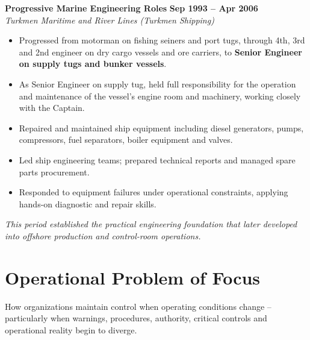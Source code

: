 \documentclass[11pt,a4paper]{article}
\begin{document}
\textbf{\color{avcsdark}Progressive Marine Engineering Roles} \hfill \textbf{\color{avcsgray}Sep 1993 -- Apr 2006} \\
\textit{Turkmen Maritime and River Lines (Turkmen Shipping)} \\
\vspace{2pt}
\begin{itemize}[leftmargin=*, nosep, itemsep=2pt]
    \item Progressed from motorman on fishing seiners and port tugs, through 4th, 3rd and 2nd engineer on dry cargo vessels and ore carriers, to \textbf{Senior Engineer on supply tugs and bunker vessels}.
    \item As Senior Engineer on supply tug, held full responsibility for the operation and maintenance of the vessel's engine room and machinery, working closely with the Captain.
    \item Repaired and maintained ship equipment including diesel generators, pumps, compressors, fuel separators, boiler equipment and valves.
    \item Led ship engineering teams; prepared technical reports and managed spare parts procurement.
    \item Responded to equipment failures under operational constraints, applying hands-on diagnostic and repair skills.
\end{itemize}

\vspace{4pt}
\textit{This period established the practical engineering foundation that later developed into offshore production and control-room operations.}

\section*{Operational Problem of Focus}

How organizations maintain control when operating conditions change -- particularly when warnings, procedures, authority, critical controls and operational reality begin to diverge.

\end{document}
